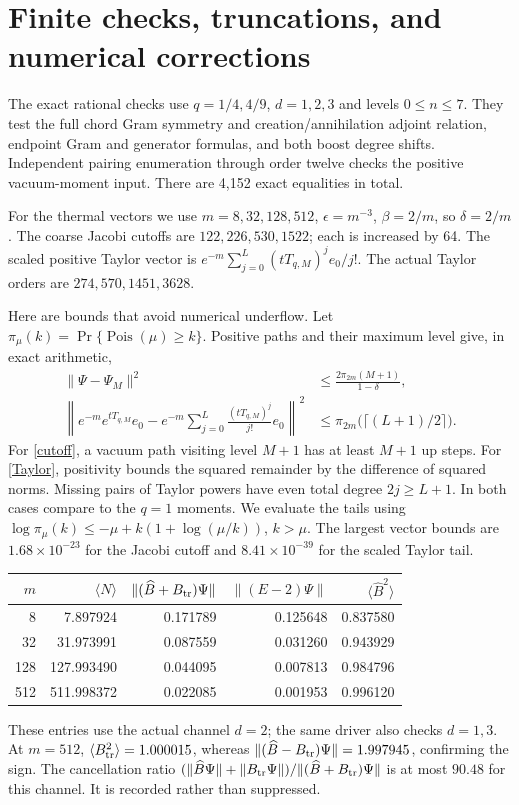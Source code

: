 \documentclass[11pt]{article}
\newcommand{\eps}{\epsilon}
\newcommand{\B}{\widehat B}
\newcommand{\Bt}{B_{\rm tr}}
\newcommand{\Pois}{\operatorname{Pois}}
\begin{document}
\newpage
\section{Finite checks, truncations, and numerical corrections}
The exact rational checks use $q=1/4,4/9$, $d=1,2,3$ and
levels $0\le n\le7$. They test the full chord Gram symmetry
and creation/annihilation adjoint relation, endpoint Gram and
generator formulas, and both boost degree shifts. Independent
pairing enumeration through order twelve checks the positive
vacuum-moment input. There are 4,152 exact equalities in total.

For the thermal vectors we use $m=8,32,128,512$,
$\eps=m^{-3}$, $\beta=2/m$, so $\delta=2/m$.
The coarse Jacobi cutoffs are $122,226,530,1522$; each is
increased by 64. The scaled positive Taylor vector is
$e^{-m}\sum_{j=0}^{L}(tT_{q,M})^je_0/j!$.
The actual Taylor orders are $274,570,1451,3628$.

Here are bounds that avoid numerical underflow. Let
$\pi_\mu(k)=\Pr\{\Pois(\mu)\ge k\}$.
Positive paths and their maximum level give, in exact arithmetic,
\begin{align}
 \|\Psi-\Psi_M\|^2&\le
           \frac{2\pi_{2m}(M+1)}{1-\delta},\label{cutoff}\\
 \left\|e^{-m}e^{tT_{q,M}}e_0-
 e^{-m}\sum_{j=0}^{L}\frac{(tT_{q,M})^j}{j!}e_0\right\|^2
 &\le\pi_{2m}\bigl(\lceil(L+1)/2\rceil\bigr).\label{Taylor}
\end{align}
For \eqref{cutoff}, a vacuum path visiting level $M+1$
has at least $M+1$ up steps. For \eqref{Taylor}, positivity
bounds the squared remainder by the difference of squared
norms. Missing pairs of Taylor powers have even total degree
$2j\ge L+1$. In both cases compare to the $q=1$ moments.
We evaluate the tails using
$\log\pi_\mu(k)\le-\mu+k(1+\log(\mu/k))$, $k>\mu$.
The largest vector bounds are $1.68\times10^{-23}$ for the
Jacobi cutoff and $8.41\times10^{-39}$ for the scaled Taylor tail.

\begin{center}
\begin{tabular}{rrrrr}
\toprule
$m$ & $\langle N\rangle$ & $\|(\B+\Bt)\Psi\|$
 & $\|(E-2)\Psi\|$ & $\langle\B^2\rangle$\\
\midrule
8   & 7.897924 & 0.171789 & 0.125648 & 0.837580\\
32  & 31.973991 & 0.087559 & 0.031260 & 0.943929\\
128 & 127.993490 & 0.044095 & 0.007813 & 0.984796\\
512 & 511.998372 & 0.022085 & 0.001953 & 0.996120\\
\bottomrule
\end{tabular}
\end{center}
These entries use the actual channel $d=2$; the same driver
also checks $d=1,3$. At $m=512$, $\langle\Bt^2\rangle=1.000015$,
whereas $\|(\B-\Bt)\Psi\|=1.997945$, confirming the sign.
The cancellation ratio
$(\|\B\Psi\|+\|\Bt\Psi\|)/\|(\B+\Bt)\Psi\|$ is at most
$90.48$ for this channel. It is recorded rather than suppressed.
\end{document}
